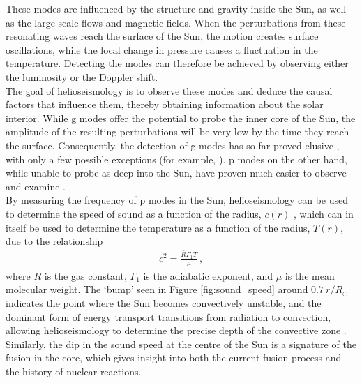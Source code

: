 \documentclass[11pt,a4paper,onecolumn]{report}
\begin{document}
These modes are influenced by the structure and gravity inside the Sun, as well
as the large scale flows and magnetic fields. When the perturbations from these
resonating waves reach the surface of the Sun, the motion creates surface
oscillations, while the local change in pressure causes a fluctuation in the
temperature. Detecting the modes can therefore be achieved by observing either the
luminosity or the Doppler shift.\\

The goal of helioseismology is to observe these modes and deduce the causal
factors that influence them, thereby obtaining information about the solar
interior. While g modes offer the potential to probe the inner core of the Sun,
the amplitude of the resulting perturbations will be very low by the time they
reach the surface. Consequently, the detection of g modes has so far proved
elusive \citep{appourchaux_quest_2010}, with only a few possible exceptions (for
example, \citealp{fossat_asymptotic_2017}). p modes on the other hand, while
unable to probe as deep into the Sun, have proven much easier to observe and
examine \citep{deubner_observations_1975}. \\

By measuring the frequency of p modes in the Sun, helioseismology can be used to determine
the speed of sound as a function of the radius, \(c\left(r\right)\)
\citep{christensen-dalsgaard_speed_1985}, which can in itself be used to
determine the temperature as a function of the radius, \(T\left(r\right)\), due
to the relationship
\begin{align}
  c^2 = \frac{\bar{R}\Gamma_1 T}{\mu} \,,
\end{align}
where \(\bar{R}\) is the gas constant, \(\Gamma_1\) is the adiabatic exponent,
and \(\mu\) is the mean molecular weight. The `bump' seen in Figure
\ref{fig:sound_speed} around \(\SI{0.7}{r \per R_\odot}\) indicates the point where the
Sun becomes convectively unstable, and the dominant form of energy transport
transitions from radiation to convection, allowing helioseismology to determine
the precise depth of the convective zone
\citep{christensen-dalsgaard_speed_1985}. Similarly, the dip in the sound speed
at the centre of the Sun is a signature of the fusion in the core, which gives
insight into both the current fusion process and the history of nuclear
reactions. \\

\end{document}
